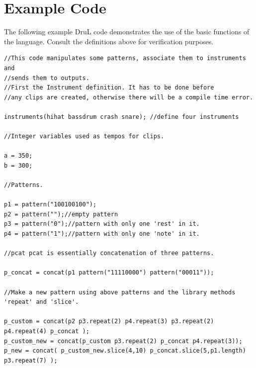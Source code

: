 \documentclass[11pt,twoside]{article}
\begin{document}
\clearpage

\section{Example Code}

The following example DruL code demonstrates the use of the basic functions of the language.
Consult the definitions above for verification purposes.

\begin{verbatim}
//This code manipulates some patterns, associate them to instruments and
//sends them to outputs.
//First the Instrument definition. It has to be done before 
//any clips are created, otherwise there will be a compile time error.

instruments(hihat bassdrum crash snare); //define four instruments

//Integer variables used as tempos for clips.

a = 350;
b = 300;

//Patterns.

p1 = pattern("100100100");
p2 = pattern("");//empty pattern
p3 = pattern("0");//pattern with only one 'rest' in it.
p4 = pattern("1");//pattern with only one 'note' in it.

//pcat pcat is essentially concatenation of three patterns.

p_concat = concat(p1 pattern("11110000") pattern("00011"));

//Make a new pattern using above patterns and the library methods 'repeat' and 'slice'. 

p_custom = concat(p2 p3.repeat(2) p4.repeat(3) p3.repeat(2) p4.repeat(4) p_concat );
p_custom_new = concat(p_custom p3.repeat(2) p_concat p4.repeat(3));
p_new = concat( p_custom_new.slice(4,10) p_concat.slice(5,p1.length) p3.repeat(7) );

\end{verbatim}
\clearpage
\end{document}
